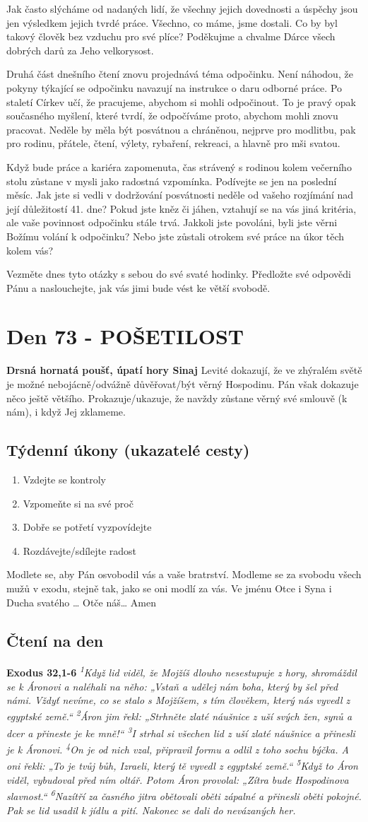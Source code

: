 \documentclass[11pt]{article}
\newcommand{\zacatekJedenactyTyden}{
\textbf{Drsná hornatá poušť, úpatí hory Sinaj} \newline 
Levité dokazují, že ve zhýralém světě je možné nebojácně/odvážně důvěřovat/být věrný Hospodinu. Pán však dokazuje něco ještě většího. Prokazuje/ukazuje, že navždy zůstane věrný své smlouvě (k nám), i když Jej zklameme.

\subsection*{Týdenní úkony (ukazatelé cesty)}
\begin{enumerate}
  \item Vzdejte se kontroly
  \item Vzpomeňte si na své proč
  \item Dobře se potřetí vyzpovídejte
  \item Rozdávejte/sdílejte radost
\end{enumerate}
Modlete se, aby Pán osvobodil vás a vaše bratrství. \newline
Modleme se za svobodu všech mužů v exodu, stejně tak, jako se oni modlí za vás.\newline
Ve jménu Otce i Syna i Ducha svatého …  Otče náš… Amen
}
\begin{document}
Jak často slýcháme od nadaných lidí, že všechny jejich dovednosti a úspěchy jsou jen výsledkem jejich tvrdé práce.
Všechno, co máme, jsme dostali. Co by byl takový člověk bez vzduchu pro své plíce? Poděkujme a chvalme Dárce
všech dobrých darů za Jeho velkorysost.

Druhá část dnešního čtení znovu projednává téma odpočinku. Není náhodou, že pokyny týkající se odpočinku navazují
na instrukce o daru odborné práce. Po staletí Církev učí, že pracujeme, abychom si mohli odpočinout. To je pravý opak
současného myšlení, které tvrdí, že odpočíváme proto, abychom mohli znovu pracovat. Neděle by měla být posvátnou
a chráněnou, nejprve pro modlitbu, pak pro rodinu, přátele, čtení, výlety, rybaření, rekreaci, a hlavně pro mši svatou.

Když bude práce a kariéra zapomenuta, čas strávený s rodinou kolem večerního stolu zůstane v mysli jako radostná
vzpomínka. Podívejte se jen na poslední měsíc. Jak jste si vedli v dodržování posvátnosti neděle od vašeho rozjímání
nad její důležitostí 41. dne? Pokud jste kněz či jáhen, vztahují se na vás jiná kritéria, ale vaše povinnost odpočinku
stále trvá. Jakkoli jste povoláni, byli jste věrni Božímu volání k odpočinku? Nebo jste zůstali otrokem své práce na
úkor těch kolem vás?

Vezměte dnes tyto otázky s sebou do své svaté hodinky. Předložte své odpovědi Pánu a naslouchejte, jak vás jimi bude
vést ke větší svobodě.



\newpage
\section{Den 73 - POŠETILOST}
\zacatekJedenactyTyden
\subsection*{Čtení na den}
\textbf{Exodus 32,1-6}
\newline
\textit{
\textsuperscript{1}Když lid viděl, že Mojžíš dlouho nesestupuje z hory, shromáždil se k Áronovi a naléhali na něho: „Vstaň a udělej nám boha, který by šel před námi. Vždyť nevíme, co se stalo s Mojžíšem, s tím člověkem, který nás vyvedl z egyptské země.“
\textsuperscript{2}Áron jim řekl: „Strhněte zlaté náušnice z uší svých žen, synů a dcer a přineste je ke mně!“
\textsuperscript{3}I strhal si všechen lid z uší zlaté náušnice a přinesli je k Áronovi.
\textsuperscript{4}On je od nich vzal, připravil formu a odlil z toho sochu býčka. A oni řekli: „To je tvůj bůh, Izraeli, který tě vyvedl z egyptské země.“
\textsuperscript{5}Když to Áron viděl, vybudoval před ním oltář. Potom Áron provolal: „Zítra bude Hospodinova slavnost.“
\textsuperscript{6}Nazítří za časného jitra obětovali oběti zápalné a přinesli oběti pokojné. Pak se lid usadil k jídlu a pití. Nakonec se dali do nevázaných her.
}
\end{document}
